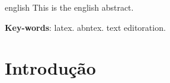 \documentclass[12pt,oneside,a4paper,chapter=TITLE, english, french,	spanish, brazil]{abntex2-logatti}
\begin{document}
\begin{resumo}[Abstract]
 \begin{otherlanguage*}{english}
   This is the english abstract. 

   \textbf{Key-words}: latex. abntex. text editoration.
 \end{otherlanguage*}
\end{resumo}



\listoffigures*
\cleardoublepage











\tableofcontents*
\cleardoublepage



\textual

\chapter*[Introdução]{Introdução}

\cleardoublepage
\end{document}

